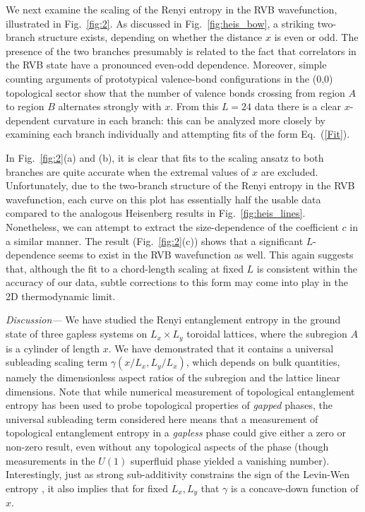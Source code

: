 \documentclass[prl,aps,twocolumn,floatfix,amsmath,amssymb,superscriptaddress,tightenlines]{revtex4}
\begin{document}
We next examine the scaling of the Renyi entropy in the RVB wavefunction, illustrated in Fig.~{\ref{fig:2}}.  
As discussed in Fig.~\ref{fig:heis_bow}, a striking two-branch structure exists, depending on whether the distance $x$ is even or odd.
The presence of the two branches presumably is related to the fact that correlators in the RVB state have a pronounced even-odd dependence. Moreover, simple counting arguments of prototypical valence-bond configurations in the (0,0) topological sector \cite{RVB1,RVB2} show that the number of valence bonds crossing from region $A$ to region $B$ alternates strongly with $x$.  From this $L=24$ data there is a clear $x$-dependent curvature in each branch: this can be analyzed more closely by examining each branch individually and attempting fits of the form Eq.~(\ref{Fit}).  

In Fig.~{\ref{fig:2}}(a) and (b), it is clear that fits to the scaling
ansatz to both branches are quite accurate when the extremal values of
$x$ are excluded.   Unfortunately, due to the two-branch structure of
the Renyi entropy in the RVB wavefunction, each curve on this plot has
essentially half the usable data compared to the analogous Heisenberg
results in Fig.~\ref{fig:heis_lines}.  Nonetheless, we can attempt to
extract the size-dependence of the coefficient $c$ in a similar
manner.  The result (Fig.~\ref{fig:2}(c)) shows that a significant
$L$-dependence seems to exist in the RVB wavefunction as well.  This
again suggests that, although the fit to a chord-length scaling at
fixed $L$ is consistent within the accuracy of our data, subtle corrections to this form may come into play in the 2D thermodynamic limit.

{\it Discussion---} We have studied the Renyi entanglement entropy in the ground state of three gapless systems on $L_x\times L_y$ toroidal lattices, where the subregion $A$ is a cylinder of length $x$.  We have  
demonstrated that it contains a universal subleading scaling term $\gamma(x/L_x,L_y/L_x)$, which depends on bulk quantities, namely the dimensionless aspect ratios of the subregion and the lattice linear dimensions.  
Note that while numerical measurement of topological entanglement entropy\cite{LW,KP} has been used to probe topological properties of {\it gapped} phases\cite{isakov}, the universal subleading term considered here means that a measurement of topological entanglement entropy in a {\it gapless} phase could give either a zero or non-zero result, even without any topological aspects of the phase (though measurements in the $U(1)$ superfluid phase yielded a vanishing number\cite{isakov}).
Interestingly, just as strong sub-additivity constrains the sign of the Levin-Wen entropy \cite{LW}, it also implies that for fixed $L_x,L_y$ that $\gamma$ is a concave-down function of $x$.
\end{document}
